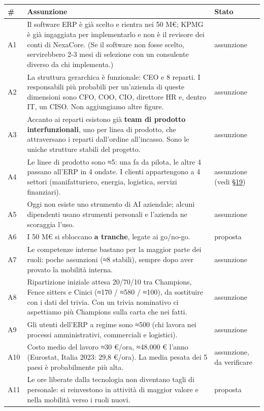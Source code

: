 \documentclass[11pt,a4paper]{article}
\begin{document}
{\small\renewcommand{\arraystretch}{1.25}
\begin{xltabular}{\linewidth}{@{}>{\raggedright\arraybackslash{}\hsize\hspace{0pt}}X>{\raggedright\arraybackslash{}\hsize\hspace{0pt}}X>{\raggedright\arraybackslash{}\hsize\hspace{0pt}}X@{}}
\toprule
\textbf{\#} & \textbf{Assunzione} & \textbf{Stato} \\
\midrule
\endhead
A1 & Il software ERP è già scelto e rientra nei 50 M€; KPMG è già ingaggiata per implementarlo e non è il revisore dei conti di NexaCore. (Se il software non fosse scelto, servirebbero 2-3 mesi di selezione con un consulente diverso da chi implementa.) & assunzione \\
A2 & La struttura gerarchica è funzionale: CEO e 8 reparti. I responsabili più probabili per un'azienda di queste dimensioni sono CFO, COO, CIO, direttore HR e, dentro IT, un CISO. Non aggiungiamo altre figure. & assunzione \\
A3 & Accanto ai reparti esistono già \textbf{team di prodotto interfunzionali}, uno per linea di prodotto, che attraversano i reparti dall'ordine all'incasso. Sono le uniche strutture stabili del progetto. & assunzione \\
A4 & Le linee di prodotto sono ≈5: una fa da pilota, le altre 4 passano all'ERP in 4 ondate. I clienti appartengono a 4 settori (manifatturiero, energia, logistica, servizi finanziari). & assunzione (vedi \hyperref[sec:19]{\S19}) \\
A5 & Oggi non esiste uno strumento di AI aziendale; alcuni dipendenti usano strumenti personali e l'azienda ne scoraggia l'uso. & assunzione \\
A6 & I 50 M€ si sbloccano \textbf{a tranche}, legate ai go/no-go. & proposta \\
A7 & Le competenze interne bastano per la maggior parte dei ruoli: poche assunzioni (≈8 stabili), sempre dopo aver provato la mobilità interna. & assunzione \\
A8 & Ripartizione iniziale attesa 20/70/10 tra Champions, Fence sitters e Cinici (≈170 / ≈580 / ≈100), da sostituire con i dati del trivia. Con un trivia nominativo ci aspettiamo più Champions sulla carta che nei fatti. & assunzione \\
A9 & Gli utenti dell'ERP a regime sono ≈500 (chi lavora nei processi amministrativi, commerciali e logistici). & assunzione \\
A10 & Costo medio del lavoro ≈30 €/ora, ≈48.000 € l'anno (Eurostat, Italia 2023: 29,8 €/ora). La media pesata dei 5 paesi è probabilmente più alta. & assunzione, da verificare \\
A11 & Le ore liberate dalla tecnologia non diventano tagli di personale: si reinvestono in attività di maggior valore e nella mobilità verso i ruoli nuovi. & proposta \\
\bottomrule
\end{xltabular}}
\end{document}
